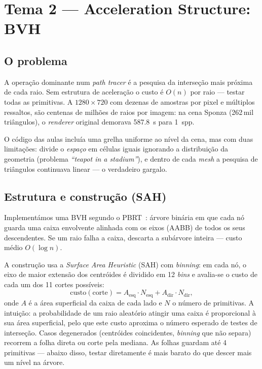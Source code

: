 \documentclass[11pt,a4paper]{article}
\begin{document}
\section{Tema 2 --- Acceleration Structure: BVH}
\label{sec:bvh}

\subsection{O problema}

A operação dominante num \emph{path tracer} é a pesquisa da interseção mais próxima de cada raio. Sem estrutura de aceleração o custo é $O(n)$ por raio --- testar todas as primitivas. A $1280\times720$ com dezenas de amostras por pixel e múltiplos ressaltos, são centenas de milhões de raios por imagem: na cena Sponza (262\,mil triângulos), o \emph{renderer} original demorava \SI{587,8}{s} para 1~spp.

O código das aulas incluía uma grelha uniforme ao nível da cena, mas com duas limitações: divide o \emph{espaço} em células iguais ignorando a distribuição da geometria (problema \emph{``teapot in a stadium''}), e dentro de cada \emph{mesh} a pesquisa de triângulos continuava linear --- o verdadeiro gargalo.

\subsection{Estrutura e construção (SAH)}

Implementámos uma BVH segundo o PBRT~\cite{pbrt}: árvore binária em que cada nó guarda uma caixa envolvente alinhada com os eixos (AABB) de todos os seus descendentes. Se um raio falha a caixa, descarta a subárvore inteira --- custo médio $O(\log n)$.

A construção usa a \emph{Surface Area Heuristic} (SAH) com \emph{binning}: em cada nó, o eixo de maior extensão dos centróides é dividido em 12 \emph{bins} e avalia-se o custo de cada um dos 11 cortes possíveis:
\begin{equation*}
  \mathrm{custo}(\text{corte}) = A_{\mathrm{esq}}\cdot N_{\mathrm{esq}} + A_{\mathrm{dir}}\cdot N_{\mathrm{dir}},
\end{equation*}
onde $A$ é a área superficial da caixa de cada lado e $N$ o número de primitivas. A intuição: a probabilidade de um raio aleatório atingir uma caixa é proporcional à sua área superficial, pelo que este custo aproxima o número esperado de testes de interseção. Casos degenerados (centróides coincidentes, \emph{binning} que não separa) recorrem a folha direta ou corte pela mediana. As folhas guardam até 4 primitivas --- abaixo disso, testar diretamente é mais barato do que descer mais um nível na árvore.
\end{document}
